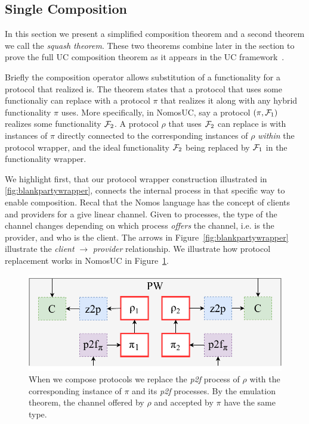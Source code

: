 \subsection{Single Composition}
In this section we present a simplified composition theorem and a second theorem we call the \textit{squash theorem}.
These two theorems combine later in the section to prove the full UC composition theorem as it appears in the UC framework~\cite{uc}.

Briefly the composition operator allows substitution of a functionality for a protocol that realized is. 
The theorem states that a protocol that uses some functionaliy \F can replace with a protocol $\pi$ that realizes it along with any hybrid functionality $\pi$ uses.
More specifically, in NomosUC, say a protocol $(\pi, \mathcal{F}_1)$ realizes some functionality $\mathcal{F}_2$.
A protocol $\rho$ that uses $\mathcal{F}_2$ can replace is with instances of $\pi$ directly connected to the corresponding instances of $\rho$ \emph{within} the protocol wrapper, and the ideal functionality $\mathcal{F}_2$ being replaced by $\mathcal{F}_1$ in the functionality wrapper.

We highlight first, that our protocol wrapper construction illustrated in \ref{fig:blankpartywrapper}, connects the internal process in that specific way to enable composition.
Recal that the Nomos language has the concept of clients and providers for a give linear channel. Given to processes, the type of the channel changes depending on which process \emph{offers} the channel, i.e. is the provider, and who is the client.
The arrows in Figure~\ref{fig:blankpartywrapper} illustrate the \emph{client} $\rightarrow$ \emph{provider} relationship.
We illustrate how protocol replacement works in NomosUC in Figure~\ref{fig:replacement}.

\begin{figure}
\centering
\includegraphics[scale=0.5]{figures/replacement2.pdf}
\caption{When we compose protocols we replace the \emph{p2f} process of $\rho$ with the corresponding instance of $\pi$ and its \emph{p2f} processes. By the emulation theorem, the channel offered by $\rho$ and accepted by $\pi$ have the same type.}
\label{fig:replacement}
\end{figure}

